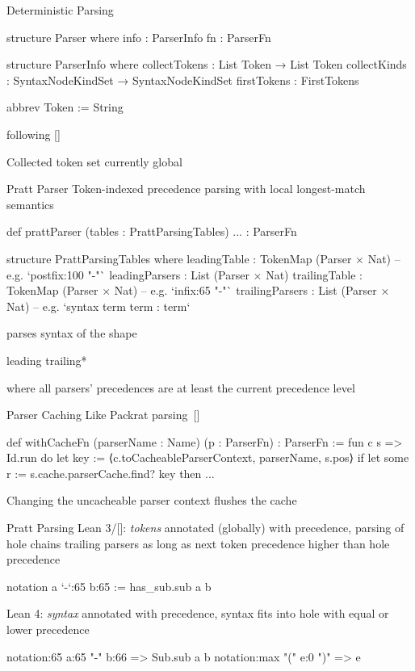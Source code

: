 \documentclass[en,t]{sdqbeamer}
\begin{document}
\begin{frame}[fragile]{Deterministic Parsing}
\begin{leancode}
structure Parser where
  info : ParserInfo
  fn   : ParserFn

structure ParserInfo where
  collectTokens : List Token → List Token
  collectKinds  : SyntaxNodeKindSet → SyntaxNodeKindSet
  firstTokens   : FirstTokens

abbrev Token := String
\end{leancode}
  following [\cite{swierstra1996deterministic}]

  \bigskip
  Collected token set currently global
\end{frame}

\begin{frame}[fragile]{Pratt Parser}
  Token-indexed precedence parsing with local longest-match semantics
\begin{leancode}
def prattParser (tables : PrattParsingTables) ... : ParserFn

structure PrattParsingTables where
  leadingTable    : TokenMap (Parser × Nat)  -- e.g. `postfix:100 "-"`
  leadingParsers  : List (Parser × Nat)
  trailingTable   : TokenMap (Parser × Nat)  -- e.g. `infix:65 "-"`
  trailingParsers : List (Parser × Nat)      -- e.g. `syntax term term : term`
\end{leancode}
  parses syntax of the shape
\begin{leancode}
  leading trailing*
\end{leancode}
 where all parsers' precedences are at least the current precedence level
\end{frame}

\begin{frame}[fragile]{Parser Caching}
Like Packrat parsing~[\cite{ford2002packrat}]
\begin{leancode}
def withCacheFn (parserName : Name) (p : ParserFn) : ParserFn := fun c s => Id.run do
  let key := ⟨c.toCacheableParserContext, parserName, s.pos⟩
  if let some r := s.cache.parserCache.find? key then
    ...
\end{leancode}
Changing the uncacheable parser context flushes the cache
\end{frame}

\begin{frame}[fragile]{Pratt Parsing}
Lean 3/[\cite{pratt1973top}]: \emph{tokens} annotated (globally) with precedence, parsing of hole chains trailing parsers as long as next token precedence higher than hole precedence
\begin{leancode}
notation a `-`:65 b:65 := has_sub.sub a b
\end{leancode}

\vfill

Lean 4: \emph{syntax} annotated with precedence, syntax fits into hole with equal or lower precedence
\begin{leancode}
notation:65 a:65 "-" b:66 => Sub.sub a b
notation:max "(" e:0 ")" => e
\end{leancode}
\end{frame}
\end{document}
